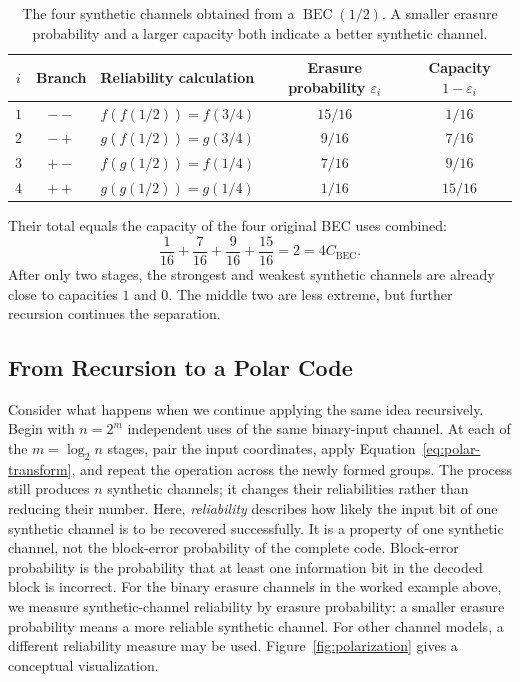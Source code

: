 \begin{table}[htbp]
\centering
\begin{tabular}{cclcc}
\toprule
$i$ & Branch & Reliability calculation & Erasure probability $\varepsilon_i$ & Capacity $1-\varepsilon_i$ \\
\midrule
$1$ & $--$ & $f(f(1/2))=f(3/4)$ & $15/16$ & $1/16$ \\
$2$ & $-+$ & $g(f(1/2))=g(3/4)$ & $9/16$ & $7/16$ \\
$3$ & $+-$ & $f(g(1/2))=f(1/4)$ & $7/16$ & $9/16$ \\
$4$ & $++$ & $g(g(1/2))=g(1/4)$ & $1/16$ & $15/16$ \\
\bottomrule
\end{tabular}
\caption{The four synthetic channels obtained from a $\operatorname{BEC}(1/2)$. A smaller erasure probability and a larger capacity both indicate a better synthetic channel.}
\label{tab:bec-four-synthetic-channels}
\end{table}

Their total equals the capacity of the four original BEC uses combined:
\begin{equation}
\frac{1}{16}+\frac{7}{16}+\frac{9}{16}+\frac{15}{16}
=2
=4C_{\mathrm{BEC}}.
\label{eq:bec-four-total-capacity}
\end{equation}
After only two stages, the strongest and weakest synthetic channels are already close to capacities $1$ and $0$. The middle two are less extreme, but further recursion continues the separation. 

\subsection{From Recursion to a Polar Code}
\label{subsec:polar-code-construction}

Consider what happens when we continue applying the same idea recursively. Begin with $n=2^m$ independent uses of the same binary-input channel. At each of the $m=\log_2n$ stages, pair the input coordinates, apply Equation~\eqref{eq:polar-transform}, and repeat the operation across the newly formed groups. The process still produces $n$ synthetic channels; it changes their reliabilities rather than reducing their number. Here, \emph{reliability} describes how likely the input bit of one synthetic channel is to be recovered successfully. It is a property of one synthetic channel, not the block-error probability of the complete code. Block-error probability is the probability that at least one information bit in the decoded block is incorrect. For the binary erasure channels in the worked example above, we measure synthetic-channel reliability by erasure probability: a smaller erasure probability means a more reliable synthetic channel. For other channel models, a different reliability measure may be used. Figure~\ref{fig:polarization} gives a conceptual visualization.

